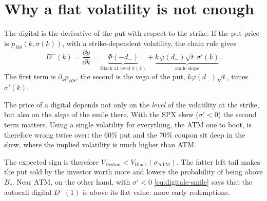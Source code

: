 \section{Why a flat volatility is not enough}
The digital is the derivative of the put with respect to the strike. If the put price is $p_{BS}(k,\sigma(k))$, with a
strike-dependent volatility, the chain rule gives
\begin{equation}\label{eq:digitale-smile}
D^-(k)=\frac{\partial p}{\partial k}
=\underbrace{\Phi(-d_-)}_{\text{Black at level }\sigma(k)}
+\underbrace{k\,\varphi(d_-)\sqrt t\,\sigma'(k)}_{\text{smile slope}} .
\end{equation}
The first term is $\partial_kp_{BS}$, the second is the vega of the put, $k\varphi(d_-)\sqrt t$, times $\sigma'(k)$.
\begin{perche}[title={Why no single volatility prices a digital}]
The price of a digital depends not only on the \emph{level} of the volatility at the strike, but also on the
\emph{slope} of the smile there. With the SPX skew ($\sigma'<0$) the second term matters. Using a single volatility
for everything, the ATM one to boot, is therefore wrong twice over: the 60\% put and the 70\% coupon sit deep in the
skew, where the implied volatility is much higher than ATM.
\end{perche}
The expected sign is therefore $V_{\text{Heston}}<V_{\text{Black}}(\sigma_{\mathrm{ATM}})$. The fatter left tail makes
the put sold by the investor worth more and lowers the probability of being above $B_c$. Near ATM, on the other hand,
with $\sigma'<0$ \eqref{eq:digitale-smile} says that the autocall digital $D^+(1)$ is above its flat value: more early
redemptions.

